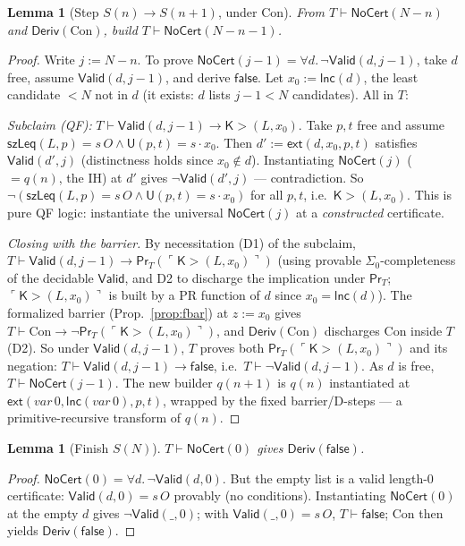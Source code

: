 \documentclass[11pt]{article}
\theoremstyle{plain}
\newtheorem{lemma}[theorem]{Lemma}
\theoremstyle{definition}
\theoremstyle{remark}
\newcommand{\code}[1]{\ulcorner #1 \urcorner}
\newcommand{\evalU}{\mathsf{U}}
\newcommand{\Prov}{\mathsf{Pr}}
\newcommand{\Con}{\mathrm{Con}}
\newcommand{\Kgt}{\mathsf{K{>}}}
\newcommand{\Valid}{\mathsf{Valid}}
\newcommand{\NoCert}{\mathsf{NoCert}}
\newcommand{\ext}{\mathsf{ext}}
\newcommand{\lnc}{\mathsf{lnc}}
\newcommand{\false}{\mathsf{false}}
\begin{document}
\begin{lemma}[Step $S(n)\to S(n{+}1)$, under $\Con$]\label{lem:step}
From $T\vdash\NoCert(N-n)$ and $\mathsf{Deriv}(\Con)$, build $T\vdash\NoCert(N-n-1)$.
\end{lemma}
\begin{proof}
Write $j:=N-n$. To prove $\NoCert(j-1)=\forall d.\,\neg\Valid(d,j-1)$, take $d$ free,
assume $\Valid(d,j-1)$, and derive $\false$. Let $x_0 := \lnc(d)$, the least
candidate $<N$ not in $d$ (it exists: $d$ lists $j-1<N$ candidates). All in $T$:

\emph{Subclaim (QF):} $T \vdash \Valid(d,j-1)\to \Kgt(L,x_0)$. Take $p,t$ free and
assume $\mathsf{szLeq}(L,p)=s\,O \wedge \evalU(p,t)=s\cdot x_0$. Then
$d' := \ext(d,x_0,p,t)$ satisfies $\Valid(d',j)$ (distinctness holds since
$x_0\notin d$). Instantiating $\NoCert(j)$ ($=q(n)$, the IH) at $d'$ gives
$\neg\Valid(d',j)$ --- contradiction. So $\neg(\mathsf{szLeq}(L,p)=s\,O\wedge
\evalU(p,t)=s\cdot x_0)$ for all $p,t$, i.e.\ $\Kgt(L,x_0)$. This is pure QF logic:
instantiate the universal $\NoCert(j)$ at a \emph{constructed} certificate.

\emph{Closing with the barrier.} By necessitation (D1) of the subclaim,
$T\vdash \Valid(d,j-1)\to \Prov_T(\code{\Kgt(L,x_0)})$ (using provable $\Sigma_0$-completeness
of the decidable $\Valid$, and D2 to discharge the implication under $\Prov_T$;
$\code{\Kgt(L,x_0)}$ is built by a PR function of $d$ since $x_0=\lnc(d)$). The
formalized barrier (Prop.~\ref{prop:fbar}) at $z:=x_0$ gives
$T\vdash \Con\to\neg\Prov_T(\code{\Kgt(L,x_0)})$, and $\mathsf{Deriv}(\Con)$ discharges
$\Con$ inside $T$ (D2). So under $\Valid(d,j-1)$, $T$ proves both
$\Prov_T(\code{\Kgt(L,x_0)})$ and its negation: $T\vdash\Valid(d,j-1)\to\false$, i.e.\
$T\vdash \neg\Valid(d,j-1)$. As $d$ is free, $T\vdash\NoCert(j-1)$. The new builder
$q(n{+}1)$ is $q(n)$ instantiated at $\ext(\mathit{var}\,0,\lnc(\mathit{var}\,0),p,t)$,
wrapped by the fixed barrier/D-steps --- a primitive-recursive transform of $q(n)$.
\end{proof}

\begin{lemma}[Finish $S(N)$]\label{lem:finish}
$T\vdash\NoCert(0)$ gives $\mathsf{Deriv}(\false)$.
\end{lemma}
\begin{proof}
$\NoCert(0)=\forall d.\,\neg\Valid(d,0)$. But the empty list is a valid length-$0$
certificate: $\Valid(d,0)=s\,O$ provably (no conditions). Instantiating $\NoCert(0)$
at the empty $d$ gives $\neg\Valid(\_,0)$; with $\Valid(\_,0)=s\,O$, $T\vdash\false$;
$\Con$ then yields $\mathsf{Deriv}(\false)$.
\end{proof}
\end{document}
